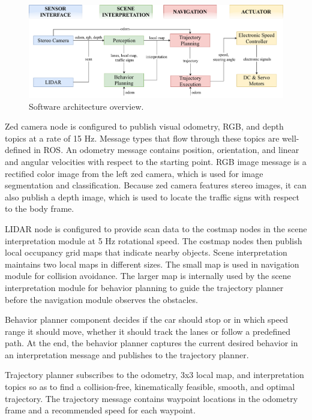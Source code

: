 \begin{figure}[h]
  \centering
  \includegraphics[width=.9\textwidth]{figures/software-architecture.pdf}
  \caption[Software architecture overview]{Software architecture overview.}
  \label{figure:software-architecture}
\end{figure}

Zed camera node is configured to publish visual odometry, RGB, and depth topics
at a rate of 15 Hz. Message types that flow through these topics are
well-defined in ROS. An odometry message contains position, orientation, and
linear and angular velocities with respect to the starting point. RGB image
message is a rectified color image from the left zed camera, which is used for
image segmentation and classification. Because zed camera features stereo
images, it can also publish a depth image, which is used to locate the traffic
signs with respect to the body frame.

LIDAR node is configured to provide scan data to the costmap nodes in the scene
interpretation module at 5 Hz rotational speed. The costmap nodes then
publish local occupancy grid maps that indicate nearby objects. Scene
interpretation maintains two local maps in different sizes. The small map is
used in navigation module for collision avoidance. The larger map is
internally used by the scene interpretation module for behavior planning to
guide the trajectory planner before the navigation module observes the
obstacles.

Behavior planner component decides if the car should stop or in which speed
range it should move, whether it should track the lanes or follow a predefined
path. At the end, the behavior planner captures the current desired
behavior in an interpretation message and publishes to the trajectory planner.

Trajectory planner subscribes to the odometry, 3x3 local map, and
interpretation topics so as to find a collision-free, kinematically feasible,
smooth, and optimal trajectory. The trajectory message contains waypoint
locations in the odometry frame and a recommended speed for each waypoint.

